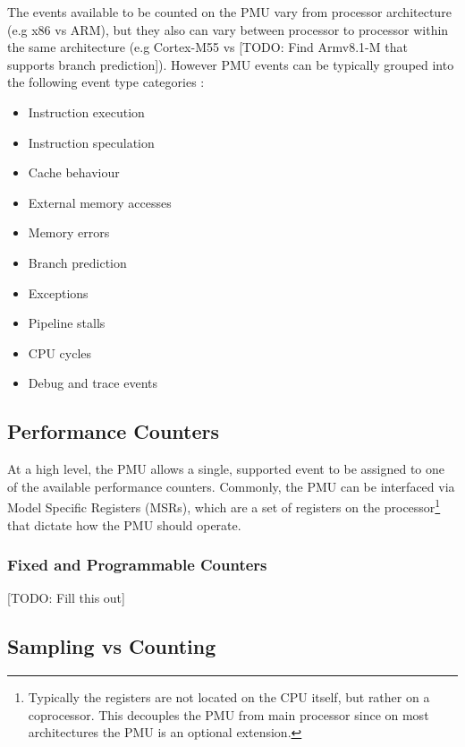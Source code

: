 {The events available to be counted on the PMU vary from processor architecture (e.g x86 vs ARM), but they also can vary between processor to processor within the same architecture (e.g Cortex-M55 vs [TODO: Find Armv8.1-M that supports branch prediction]). However PMU events can be typically grouped into the following event type categories \cite{DocsArmv8PMU}:

\begin{multicols}{2}
\ssp
\begin{itemize}
    \item Instruction execution
    \item Instruction speculation
    \item Cache behaviour 
    \item External memory accesses
    \item Memory errors
\end{itemize}
\columnbreak
\begin{itemize}
    \item Branch prediction
    \item Exceptions
    \item Pipeline stalls
    \item CPU cycles
    \item Debug and trace events
\end{itemize}
\dsp
\end{multicols}

\subsection{Performance Counters}

At a high level, the PMU allows a single, supported event to be assigned to one of the available performance counters. Commonly, the PMU can be interfaced via Model Specific Registers (MSRs), which are a set of registers on the processor\footnote{Typically the registers are not located on the CPU itself, but rather on a coprocessor. This decouples the PMU from main processor since on most architectures the PMU is an optional extension.} that dictate how the PMU should operate.

\subsubsection{Fixed and Programmable Counters}

[TODO: Fill this out]

\subsection{Sampling vs Counting}\label{sect:sampling_counting}

}
